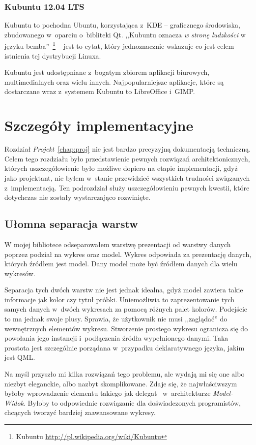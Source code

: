 \subsubsection{Kubuntu 12.04 LTS}
Kubuntu to pochodna Ubuntu, korzystająca z~KDE -- graficznego środowiska, zbudowanego w~oparciu o~bibliteki Qt. ,,Kubuntu oznacza \textit{w stronę ludzkości} w języku bemba''~\footnote{Kubuntu \url{http://pl.wikipedia.org/wiki/Kubuntu}} -- jest to cytat, który jednoznacznie wskazuje co jest celem istnienia tej dystrybucji Linuxa.

Kubuntu jest udostępniane z~bogatym zbiorem aplikacji biurowych, multimedialnych oraz wielu innych. Najpopularniejsze aplikacje, które są dostarczane wraz z~systemem Kubuntu to LibreOffice i~GIMP. 


\section{Szczegóły implementacyjne}
Rozdział \textit{Projekt}~\ref{chap:proj} nie jest bardzo precyzyjną dokumentacją techniczną. Celem tego rozdziału było przedstawienie pewnych rozwiązań architektonicznych, których uszczegółowienie było możliwe dopiero na etapie implementacji, gdyż jako projektant, nie byłem w~stanie przewidzieć wszystkich trudności związanych z~implementacją. Ten podrozdział służy uszczegółowieniu pewnych kwestii, które dotychczas nie zostały wystarczająco rozwinięte.

\subsection{Ułomna separacja warstw}
W mojej bibliotece odseparowałem warstwę prezentacji od warstwy danych poprzez podział na wykres oraz model. Wykres odpowiada za prezentację danych, których źródłem jest model. Dany model może być źródłem danych dla wielu wykresów.

Separacja tych dwóch warstw nie jest jednak idealna, gdyż model zawiera takie informacje jak kolor czy tytuł próbki. Uniemożliwia to zaprezentowanie tych samych danych w~dwóch wykresach za pomocą różnych palet kolorów. Podejście to ma jednak swoje plusy. Sprawia, że użytkownik nie musi ,,zaglądać'' do wewnętrznych elementów wykresu. Stworzenie prostego wykresu ogranicza się do powołania jego instancji i~podłączenia źródła wypełnionego danymi. Taka prostota jest szczególnie porządana w~przypadku deklaratywnego języka, jakim jest QML.

Na myśl przyszło mi kilka rozwiązań tego problemu, ale wydają mi się one albo niezbyt eleganckie, albo nazbyt skomplikowane. Zdaje się, że najwłaściwszym byłoby wprowadzenie elementu takiego jak delegat~\cite{Qt:Delegate} w~architekturze \textit{Model-Widok}. Byłoby to odpowiednie rozwiązanie dla doświadczonych programistów, chcących tworzyć bardziej zaawansowane wykresy.

